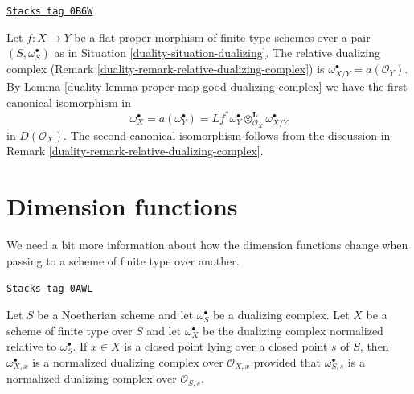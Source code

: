 \begin{remark}
\label{duality-remark-relative-dualizing-complex-shriek}
\href{https://stacks.math.columbia.edu/tag/0B6W}{\texttt{Stacks tag 0B6W}}

Let $f : X \to Y$ be a flat proper morphism of finite type
schemes over a pair $(S, \omega_S^\bullet)$ as in
Situation \ref{duality-situation-dualizing}. The relative dualizing complex
(Remark \ref{duality-remark-relative-dualizing-complex}) is
$\omega_{X/Y}^\bullet = a(\mathcal{O}_Y)$. By
Lemma \ref{duality-lemma-proper-map-good-dualizing-complex}
we have the first canonical isomorphism in
$$
\omega_X^\bullet = a(\omega_Y^\bullet) =
Lf^*\omega_Y^\bullet \otimes_{\mathcal{O}_X}^\mathbf{L} \omega_{X/Y}^\bullet
$$
in $D(\mathcal{O}_X)$. The second canonical isomorphism follows from the
discussion in Remark \ref{duality-remark-relative-dualizing-complex}.
\end{remark}

\section{Dimension functions}
\label{duality-section-dimension-functions}
We need a bit more information about how the dimension functions change
when passing to a scheme of finite type over another.

\begin{lemma}
\label{duality-lemma-good-dualizing-normalized}
\href{https://stacks.math.columbia.edu/tag/0AWL}{\texttt{Stacks tag 0AWL}}

Let $S$ be a Noetherian scheme and let $\omega_S^\bullet$ be a
dualizing complex. Let $X$ be a scheme of finite type over $S$ and let
$\omega_X^\bullet$ be the dualizing complex normalized relative
to $\omega_S^\bullet$. If $x \in X$ is a closed point lying over
a closed point $s$ of $S$, then $\omega_{X, x}^\bullet$
is a normalized dualizing complex over $\mathcal{O}_{X, x}$
provided that $\omega_{S, s}^\bullet$ is a normalized dualizing
complex over $\mathcal{O}_{S, s}$.
\end{lemma}

